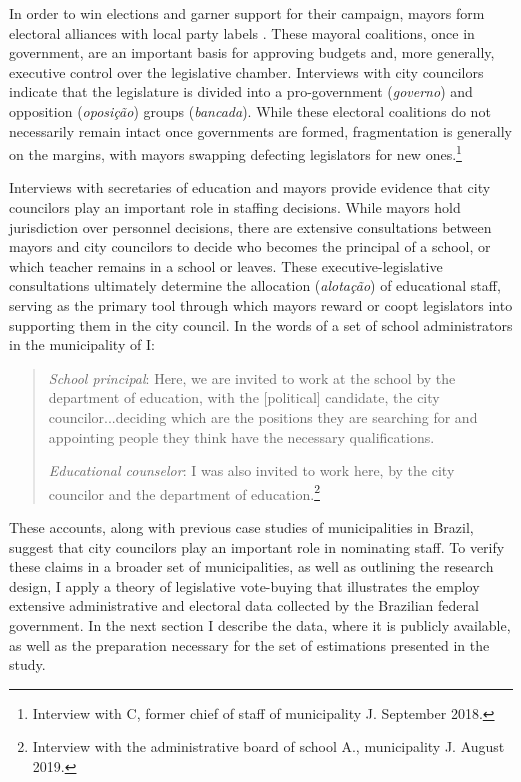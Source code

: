 \documentclass[12pt,a4paper]{article}
\begin{document}
In order to win elections and garner support for their campaign, mayors form electoral alliances with local party labels \citet{dantas_eleicoes_2013}. These mayoral coalitions, once in government, are an important basis for approving budgets and, more generally, executive control over the legislative chamber. Interviews with city councilors indicate that the legislature is divided into a pro-government (\textit{governo}) and opposition (\textit{oposição}) groups (\textit{bancada}). While these electoral coalitions do not necessarily remain intact once governments are formed, fragmentation is generally on the margins, with mayors swapping defecting legislators for new ones.\footnote{Interview with C, former chief of staff of municipality J. September 2018.}

Interviews with secretaries of education and mayors provide evidence that city councilors play an important role in staffing decisions. While mayors hold jurisdiction over personnel decisions, there are extensive consultations between mayors and city councilors to decide who becomes the principal of a school, or which teacher remains in a school or leaves. These executive-legislative consultations ultimately determine the allocation (\textit{alotação}) of educational staff, serving as the primary tool through which mayors reward or coopt legislators into supporting them in the city council. In the words of a set of school administrators in the municipality of I:

\begin{quote}
    \emph{School principal}: Here, we are invited to work at the school by the department of education, with the [political] candidate, the city councilor...deciding which are the positions they are searching for and appointing people they think have the necessary qualifications.

    \emph{Educational counselor}: I was also invited to work here, by the city councilor and the department of education.\footnote{Interview with the administrative board of school A., municipality J. August 2019.}
\end{quote}

These accounts, along with previous case studies of municipalities in Brazil, suggest that city councilors play an important role in nominating staff. To verify these claims in a broader set of municipalities, as well as outlining the research design, I apply a theory of legislative vote-buying that illustrates the  employ extensive administrative and electoral data collected by the Brazilian federal government. In the next section I describe the data, where it is publicly available, as well as the preparation necessary for the set of estimations presented in the study.
\end{document}
